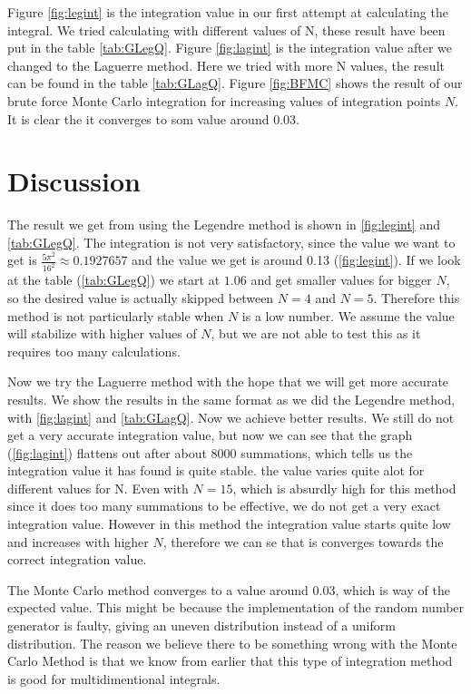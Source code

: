 \documentclass{emulateapj}
\begin{document}
	Figure \ref{fig:legint} is the integration value in our first attempt at calculating the integral. We tried calculating with different values of N, these result have been put in the table \ref{tab:GLegQ}. Figure \ref{fig:lagint} is the integration value after we changed to the Laguerre method. Here we tried with more N values, the result can be found in the table \ref{tab:GLagQ}. Figure \ref{fig:BFMC} shows the result of our brute force Monte Carlo integration for increasing values of integration points $N$. It is clear the it converges to som value around 0.03.
	
	\section{Discussion}
	\label{sec:discussion}
	The result we get from using the Legendre method is shown in \ref{fig:legint} and \ref{tab:GLegQ}. The integration is not very satisfactory, since the value we want to get is $\frac{5\pi^2}{16^2}\approx 0.1927657$ and the value we get is around 0.13 (\ref{fig:legint}). If we look at the table (\ref{tab:GLegQ}) we start at $1.06$ and get smaller values for bigger $N$, so the desired value is actually skipped between $N=4$ and $N=5$. Therefore this method is not particularly stable when $N$ is a low number. We assume the value will stabilize with higher values of $N$, but we are not able to test this as it requires too many calculations. \par
	
	Now we try the Laguerre method with the hope that we will get more accurate results. We show the results in the same format as we did the Legendre method, with \ref{fig:lagint} and \ref{tab:GLagQ}. Now we achieve better results. We still do not get a very accurate integration value, but now we can see that the graph (\ref{fig:lagint}) flattens out after about $8000$ summations, which tells us the integration value it has found is quite stable. the value varies quite alot for different values for N. Even with $N=15$, which is absurdly high for this method since it does too many summations to be effective, we do not get a very exact integration value. However in this method the integration value starts quite low and increases with higher $N$, therefore we can se that is  converges towards the correct integration value. \par
	
	The Monte Carlo method converges to a value around 0.03, which is way of the expected value. This might be because the implementation of the random number generator is faulty, giving an uneven distribution instead of a uniform distribution. The reason we believe there to be something wrong with the Monte Carlo Method is that we know from earlier that this type of integration method is good for multidimentional integrals.
	
\end{document}
